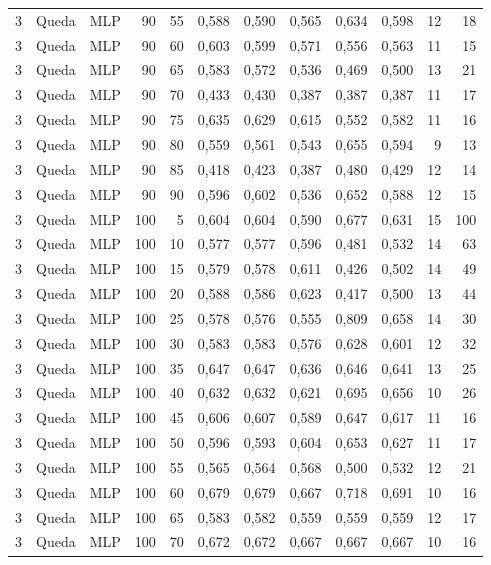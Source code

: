 \begin{longtable}{@{}rllrrrrrrrrr@{}}
3 & Queda & MLP & 90 & 55 & 0,588 & 0,590 & 0,565 & 0,634 & 0,598 & 12 & 18 \\
3 & Queda & MLP & 90 & 60 & 0,603 & 0,599 & 0,571 & 0,556 & 0,563 & 11 & 15 \\
3 & Queda & MLP & 90 & 65 & 0,583 & 0,572 & 0,536 & 0,469 & 0,500 & 13 & 21 \\
3 & Queda & MLP & 90 & 70 & 0,433 & 0,430 & 0,387 & 0,387 & 0,387 & 11 & 17 \\
3 & Queda & MLP & 90 & 75 & 0,635 & 0,629 & 0,615 & 0,552 & 0,582 & 11 & 16 \\
3 & Queda & MLP & 90 & 80 & 0,559 & 0,561 & 0,543 & 0,655 & 0,594 & 9 & 13 \\
3 & Queda & MLP & 90 & 85 & 0,418 & 0,423 & 0,387 & 0,480 & 0,429 & 12 & 14 \\
3 & Queda & MLP & 90 & 90 & 0,596 & 0,602 & 0,536 & 0,652 & 0,588 & 12 & 15 \\
3 & Queda & MLP & 100 & 5 & 0,604 & 0,604 & 0,590 & 0,677 & 0,631 & 15 & 100 \\
3 & Queda & MLP & 100 & 10 & 0,577 & 0,577 & 0,596 & 0,481 & 0,532 & 14 & 63 \\
3 & Queda & MLP & 100 & 15 & 0,579 & 0,578 & 0,611 & 0,426 & 0,502 & 14 & 49 \\
3 & Queda & MLP & 100 & 20 & 0,588 & 0,586 & 0,623 & 0,417 & 0,500 & 13 & 44 \\
3 & Queda & MLP & 100 & 25 & 0,578 & 0,576 & 0,555 & 0,809 & 0,658 & 14 & 30 \\
3 & Queda & MLP & 100 & 30 & 0,583 & 0,583 & 0,576 & 0,628 & 0,601 & 12 & 32 \\
3 & Queda & MLP & 100 & 35 & 0,647 & 0,647 & 0,636 & 0,646 & 0,641 & 13 & 25 \\
3 & Queda & MLP & 100 & 40 & 0,632 & 0,632 & 0,621 & 0,695 & 0,656 & 10 & 26 \\
3 & Queda & MLP & 100 & 45 & 0,606 & 0,607 & 0,589 & 0,647 & 0,617 & 11 & 16 \\
3 & Queda & MLP & 100 & 50 & 0,596 & 0,593 & 0,604 & 0,653 & 0,627 & 11 & 17 \\
3 & Queda & MLP & 100 & 55 & 0,565 & 0,564 & 0,568 & 0,500 & 0,532 & 12 & 21 \\
3 & Queda & MLP & 100 & 60 & 0,679 & 0,679 & 0,667 & 0,718 & 0,691 & 10 & 16 \\
3 & Queda & MLP & 100 & 65 & 0,583 & 0,582 & 0,559 & 0,559 & 0,559 & 12 & 17 \\
3 & Queda & MLP & 100 & 70 & 0,672 & 0,672 & 0,667 & 0,667 & 0,667 & 10 & 16 \\

\end{longtable}
